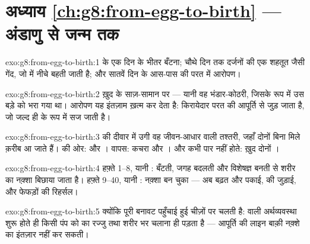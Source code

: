 \section*{अध्याय \ref{ch:g8:from-egg-to-birth} --- अंडाणु से जन्म तक}

\begin{solution}{exo:g8:from-egg-to-birth:1}
 के एक दिन के भीतर बँटना; चौथे दिन तक दर्जनों  की एक
शहतूत जैसी गेंद, जो  में नीचे बहती जाती है; और सातवें दिन के
आस-पास  की परत में आरोपण।
\end{solution}

\begin{solution}{exo:g8:from-egg-to-birth:2}
ख़ुद  के साज़-सामान पर --- यानी वह भंडार-कोठरी, जिसके रूप में उस
बड़े  को भरा गया था। आरोपण यह इंतज़ाम ख़त्म कर देता है: किरायेदार
परत की आपूर्ति से जुड़ जाता है, जो जल्द ही  के रूप में सज जाती है।
\end{solution}

\begin{solution}{exo:g8:from-egg-to-birth:3}
 की दीवार में उगी वह जीवन-आधार वाली तश्तरी, जहाँ दोनों  बिना
मिले क़रीब आ जाते हैं।  की ओर:  और । वापस: कचरा और
। और कभी पार नहीं होते: ख़ुद दोनों ।
\end{solution}

\begin{solution}{exo:g8:from-egg-to-birth:4}
हफ़्ते 1--8, यानी : बँटती, जगह बदलती और विशेषज्ञ बनती  से
शरीर का नक़्शा बिछाया जाता है। हफ़्ते 9--40, यानी : नक़्शा
बन चुका --- अब बढ़त और पकाई,  की जुड़ाई, और फेफड़ों की
रिहर्सल।
\end{solution}

\begin{solution}{exo:g8:from-egg-to-birth:5}
क्योंकि पूरी बनावट पहुँचाई हुई चीज़ों पर चलती है:  वाली अर्थव्यवस्था
शुरू होते ही किसी पंप को  का  रज्जु तथा शरीर भर चलाना ही पड़ता
है --- आपूर्ति की लाइन बाक़ी नक़्शे का इंतज़ार नहीं कर सकती।
\end{solution}

